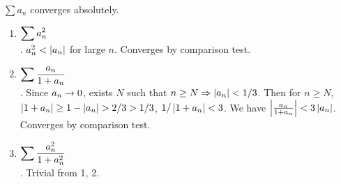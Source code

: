\\
 $ \sum a_n $ converges absolutely.
\begin{enumerate}
	\item $\displaystyle \sum a_n^2 $\\
	\pf. $a_n^2 < \left|a_n\right|$ for large $n$. Converges by comparison test.
	\item $\displaystyle \sum \frac{a_n}{1+a_n}$\\
	\pf. Since $a_n\rightarrow 0$, exists $N$ such that $n\geq N \Rightarrow \left|a_n\right|<1/3$. Then for $n\geq N$, $\left|1+a_n\right| \geq 1-\left|a_n\right| > 2/3 > 1/3$, $1/\left|1+a_n\right| < 3$. We have $\left|\frac{a_n}{1+a_n}\right| < 3\left|a_n\right|$. Converges by comparison test.
	\item $\displaystyle \sum \frac{a_n^2}{1+a_n^2}$\\
	\pf. Trivial from 1, 2.
\end{enumerate}

\pagebreak